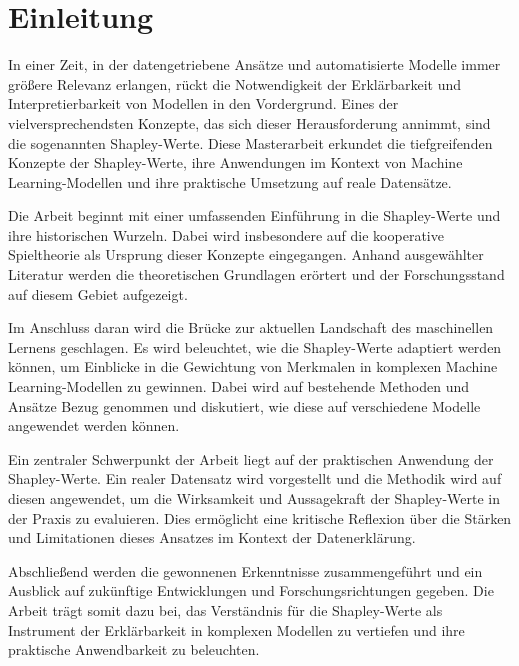 \chapter{Einleitung}

In einer Zeit, in der datengetriebene Ansätze und automatisierte Modelle immer größere Relevanz erlangen, rückt die Notwendigkeit der Erklärbarkeit und Interpretierbarkeit von Modellen in den Vordergrund. Eines der vielversprechendsten Konzepte, das sich dieser Herausforderung annimmt, sind die sogenannten Shapley-Werte. Diese Masterarbeit erkundet die tiefgreifenden Konzepte der Shapley-Werte, ihre Anwendungen im Kontext von Machine Learning-Modellen und ihre praktische Umsetzung auf reale Datensätze.

Die Arbeit beginnt mit einer umfassenden Einführung in die Shapley-Werte und ihre historischen Wurzeln. Dabei wird insbesondere auf die kooperative Spieltheorie als Ursprung dieser Konzepte eingegangen. Anhand ausgewählter Literatur werden die theoretischen Grundlagen erörtert und der Forschungsstand auf diesem Gebiet aufgezeigt.

Im Anschluss daran wird die Brücke zur aktuellen Landschaft des maschinellen Lernens geschlagen. Es wird beleuchtet, wie die Shapley-Werte adaptiert werden können, um Einblicke in die Gewichtung von Merkmalen in komplexen Machine Learning-Modellen zu gewinnen. Dabei wird auf bestehende Methoden und Ansätze Bezug genommen und diskutiert, wie diese auf verschiedene Modelle angewendet werden können.

Ein zentraler Schwerpunkt der Arbeit liegt auf der praktischen Anwendung der Shapley-Werte. Ein realer Datensatz wird vorgestellt und die Methodik wird auf diesen angewendet, um die Wirksamkeit und Aussagekraft der Shapley-Werte in der Praxis zu evaluieren. Dies ermöglicht eine kritische Reflexion über die Stärken und Limitationen dieses Ansatzes im Kontext der Datenerklärung.

Abschließend werden die gewonnenen Erkenntnisse zusammengeführt und ein Ausblick auf zukünftige Entwicklungen und Forschungsrichtungen gegeben. Die Arbeit trägt somit dazu bei, das Verständnis für die Shapley-Werte als Instrument der Erklärbarkeit in komplexen Modellen zu vertiefen und ihre praktische Anwendbarkeit zu beleuchten.